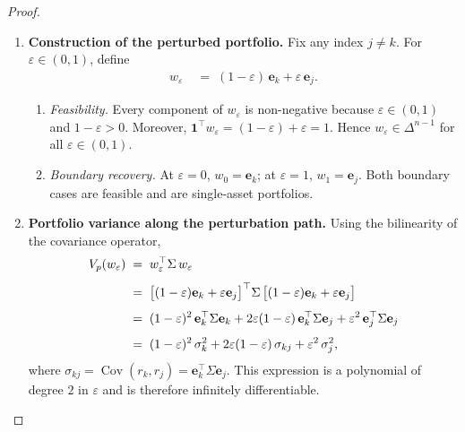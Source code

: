 \documentclass[12pt,openany]{book}
\newcommand{\bfw}{\mathbf{w}}
\newcommand{\bfe}{\mathbf{e}}
\DeclareMathOperator{\Cov}{Cov}
\numberwithin{equation}{chapter}
\theoremstyle{plain}
\theoremstyle{definition}
\theoremstyle{remark}
\def\bfw{w}%
\begin{document}
\begin{proof}
\begin{enumerate}
  \item \textbf{Construction of the perturbed portfolio.}
        Fix any index $j \neq k$.  For $\varepsilon \in (0,1)$,
        define
        \begin{align}
          \bfw_\varepsilon
          &\;=\; (1-\varepsilon)\,\bfe_k + \varepsilon\,\bfe_j.
          \label{eq:nc-pert-def}
        \end{align}
        \begin{enumerate}
          \item \emph{Feasibility.}
                Every component of $\bfw_\varepsilon$ is
                non-negative because $\varepsilon \in (0,1)$ and
                $1-\varepsilon > 0$.  Moreover,
                $\mathbf{1}^\top\bfw_\varepsilon
                = (1-\varepsilon) + \varepsilon = 1$.
                Hence $\bfw_\varepsilon \in \Delta^{n-1}$ for all
                $\varepsilon \in (0,1)$.
          \item \emph{Boundary recovery.}
                At $\varepsilon = 0$, $\bfw_0 = \bfe_k$;
                at $\varepsilon = 1$, $\bfw_1 = \bfe_j$.
                Both boundary cases are feasible and are
                single-asset portfolios.
        \end{enumerate}

  \item \textbf{Portfolio variance along the perturbation path.}
        Using the bilinearity of the covariance operator,
        \begin{align}
          V_p(\bfw_\varepsilon)
          &\;=\; \bfw_\varepsilon^\top \Sigma\,\bfw_\varepsilon
          \notag\\[4pt]
          &\;=\;
            \bigl[(1-\varepsilon)\bfe_k + \varepsilon\bfe_j\bigr]^\top
            \Sigma\,
            \bigl[(1-\varepsilon)\bfe_k + \varepsilon\bfe_j\bigr]
          \notag\\[4pt]
          &\;=\; (1-\varepsilon)^2\,\bfe_k^\top\Sigma\bfe_k
                 + 2\varepsilon(1-\varepsilon)\,\bfe_k^\top\Sigma\bfe_j
                 + \varepsilon^2\,\bfe_j^\top\Sigma\bfe_j
          \notag\\[4pt]
          &\;=\; (1-\varepsilon)^2\,\sigma_k^2
                 + 2\varepsilon(1-\varepsilon)\,\sigma_{kj}
                 + \varepsilon^2\,\sigma_j^2,
          \label{eq:nc-var-eps}
        \end{align}
        where $\sigma_{kj} = \Cov(r_k,r_j) = \bfe_k^\top\Sigma\bfe_j$.
        This expression is a polynomial of degree $2$ in
        $\varepsilon$ and is therefore infinitely differentiable.


\end{enumerate}
\end{proof}
\end{document}
